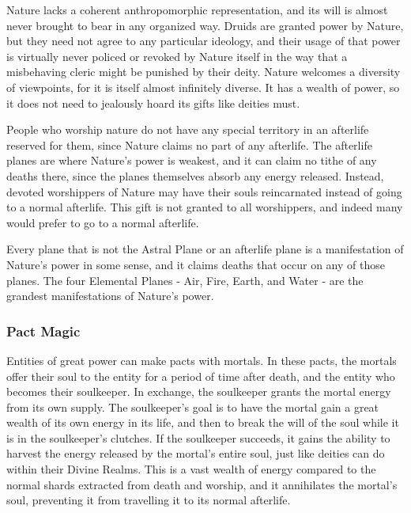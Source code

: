       Nature lacks a coherent anthropomorphic representation, and its will is almost never brought to bear in any organized way.
      Druids are granted power by Nature, but they need not agree to any particular ideology, and their usage of that power is virtually never policed or revoked by Nature itself in the way that a misbehaving cleric might be punished by their deity.
      Nature welcomes a diversity of viewpoints, for it is itself almost infinitely diverse.
      It has a wealth of power, so it does not need to jealously hoard its gifts like deities must.

      People who worship nature do not have any special territory in an afterlife reserved for them, since Nature claims no part of any afterlife.
      The afterlife planes are where Nature's power is weakest, and it can claim no tithe of any deaths there, since the planes themselves absorb any energy released.
      Instead, devoted worshippers of Nature may have their souls reincarnated instead of going to a normal afterlife.
      This gift is not granted to all worshippers, and indeed many would prefer to go to a normal afterlife.

      Every plane that is not the Astral Plane or an afterlife plane is a manifestation of Nature's power in some sense, and it claims deaths that occur on any of those planes.
      The four Elemental Planes - Air, Fire, Earth, and Water - are the grandest manifestations of Nature's power.

    \subsubsection{Pact Magic}
      Entities of great power can make pacts with mortals.
      In these pacts, the mortals offer their soul to the entity for a period of time after death, and the entity who becomes their soulkeeper.
      In exchange, the soulkeeper grants the mortal energy from its own supply.
      The soulkeeper's goal is to have the mortal gain a great wealth of its own energy in its life, and then to break the will of the soul while it is in the soulkeeper's clutches.
      If the soulkeeper succeeds, it gains the ability to harvest the energy released by the mortal's entire soul, just like deities can do within their Divine Realms.
      This is a vast wealth of energy compared to the normal shards extracted from death and worship, and it annihilates the mortal's soul, preventing it from travelling it to its normal afterlife.

